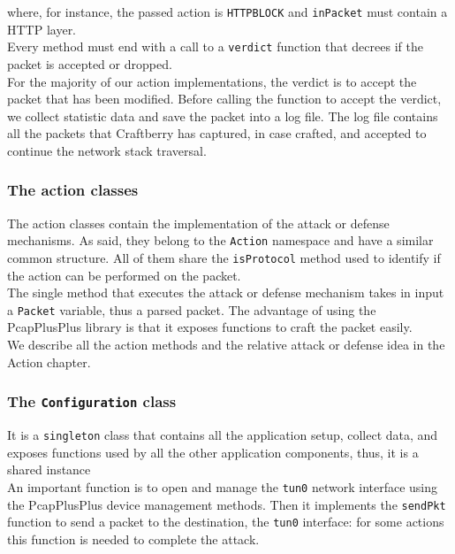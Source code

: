 \documentclass[12pt]{article}
\begin{document}
	where, for instance, the passed action is \lstinline{HTTPBLOCK} and \lstinline{inPacket} must contain a HTTP layer.\\
	Every method must end with a call to a \lstinline{verdict} function that decrees if the packet is accepted or dropped.\\
	For the majority of our action implementations, the verdict is to accept the packet that has been modified. Before calling the function to accept the verdict, we collect statistic data and save the packet into a log file. The log file contains all the packets that Craftberry has captured, in case crafted, and accepted to continue the network stack traversal.

	\subsubsection{The action classes}

	The action classes contain the implementation of the attack or defense mechanisms. As said, they belong to the \lstinline{Action} namespace and have a similar common structure. All of them share the \lstinline{isProtocol} method used to identify if the action can be performed on the packet.\\
	The single method that executes the attack or defense mechanism takes in input a \lstinline{Packet} variable, thus a parsed packet. The advantage of using the PcapPlusPlus library is that it exposes functions to craft the packet easily.\\
	\bigbreak
	We describe all the action methods and the relative attack or defense idea in the Action chapter.

	\subsubsection{The \lstinline{Configuration} class}
	
	It is a \lstinline{singleton} class that contains all the application setup, collect data, and exposes functions used by all the other application components, thus, it is a shared instance\\
	\bigbreak
	An important function is to open and manage the \lstinline{tun0} network interface using the PcapPlusPlus device management methods. Then it implements the \lstinline{sendPkt} function to send a packet to the destination, the \lstinline{tun0} interface: for some actions this function is needed to complete the attack.\\
	
\end{document}
